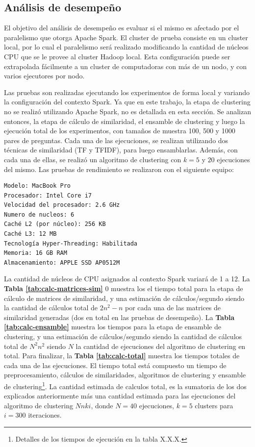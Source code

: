 \subsection{Análisis de desempeño}

El objetivo del análisis de desempeño es evaluar si el mismo es afectado por el paralelismo que otorga Apache Spark. El cluster de prueba consiste en un cluster local, por lo cual el paralelismo será realizado modificando la cantidad de núcleos CPU que se le provee al cluster Hadoop local. Esta configuración puede ser extrapolada fácilmente a un cluster de computadoras con más de un nodo, y con varios ejecutores por nodo.

\bigskip Las pruebas son realizadas ejecutando los experimentos de forma local y variando la configuración del contexto Spark. Ya que en este trabajo, la etapa de clustering no se realizó utilizando Apache Spark, no es detallada en esta sección. Se analizan entonces, la etapa de cálculo de similaridad, el ensamble de clustering y luego la ejecución total de los experimentos, con tamaños de muestra 100, 500 y 1000 pares de preguntas. Cada una de las ejecuciones, se realizan utilizando dos técnicas de similaridad (TF y TFIDF), para luego ensamblarlas. Además, con cada una de ellas, se realizó un algoritmo de clustering con \(k = 5\) y \(20\) ejecuciones del mismo. Las pruebas de rendimiento se realizaron con el siguiente equipo:

\begin{verbatim}
Modelo: MacBook Pro
Procesador: Intel Core i7
Velocidad del procesador: 2.6 GHz
Numero de nucleos: 6
Caché L2 (por núcleo): 256 KB
Caché L3: 12 MB
Tecnología Hyper-Threading: Habilitada
Memoria: 16 GB RAM
Almacenamiento: APPLE SSD AP0512M
\end{verbatim}

\bigskip La cantidad de núcleos de CPU asignados al contexto Spark variará de 1 a 12. La \textbf{Tabla \ref{tab:calc-matrices-sim}} 0 muestra los el tiempo total para la etapa de cálculo de matrices de similaridad, y una estimación de cálculos/segundo siendo la cantidad de cálculos total de \(2n^2-n\) por cada una de las matrices de similaridad generadas (dos en total en las pruebas de desempeño). La \textbf{Tabla \ref{tab:calc-ensamble}} muestra los tiempos para la etapa de ensamble de clustering, y una estimación de cálculos/segundo siendo la cantidad de cálculos total de \(N^2n^2\) siendo \(N\) la cantidad de ejecuciones del algoritmo de clustering en total. Para finalizar, la \textbf{Tabla \ref{tab:calc-total}}  muestra los tiempos totales de cada una de las ejecuciones. El tiempo total está compuesto un tiempo de preprocesamiento, cálculos de similaridades, algoritmos de clustering y ensamble de clustering\footnote{Detalles de los tiempos de ejecución en la tabla X.X.X.}. La cantidad estimada de calculos total, es la sumatoria de los dos explicados anteriormente más una cantidad estimada para las ejecuciones del algoritmo de clustering \(Nnki\), donde \(N=40\) ejecuciones, \(k=5\) clusters para \(i=300\) iteraciones.

